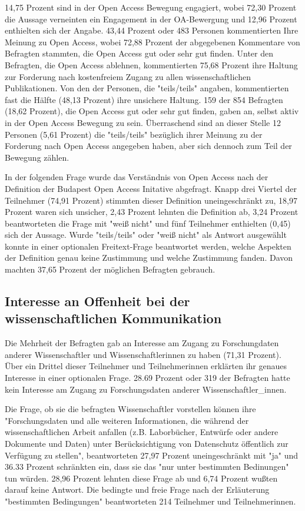 14,75 Prozent sind in der Open Access Bewegung engagiert, wobei 72,30 Prozent die Aussage verneinten ein Engagement in der OA-Bewergung und 12,96 Prozent enthielten sich der Angabe. 43,44 Prozent oder 483 Personen kommentierten Ihre Meinung zu Open Access, wobei 72,88 Prozent der abgegebenen Kommentare von Befragten stammten, die Open Access gut oder sehr gut finden. Unter den Befragten, die Open Access ablehnen, kommentierten 75,68 Prozent ihre Haltung zur Forderung nach kostenfreiem Zugang zu allen wissenschaftlichen Publikationen. Von den der Personen, die "teils/teils" angaben, kommentierten fast die Hälfte (48,13 Prozent) ihre unsichere Haltung. 159 der 854 Befragten (18,62 Prozent), die Open Access gut oder sehr gut finden, gaben an, selbst aktiv in der Open Access Bewegung zu sein. Überraschend sind an dieser Stelle 12 Personen (5,61 Prozent) die "teils/teils" bezüglich ihrer Meinung zu der Forderung nach Open Access angegeben haben, aber sich dennoch zum Teil der Bewegung zählen.

In der folgenden Frage wurde das Verständnis von Open Access nach der Definition der Budapest Open Access Initative \cite{boai_2012} abgefragt. Knapp drei Viertel der Teilnehmer (74,91 Prozent) stimmten dieser Definition uneingeschränkt zu, 18,97 Prozent waren sich unsicher, 2,43 Prozent lehnten die Definition ab, 3,24 Prozent beantworteten die Frage mit "weiß nicht" und fünf Teilnehmer enthielten (0,45) sich der Aussage. Wurde "teils/teils" oder "weiß nicht" als Antwort ausgewählt konnte in einer optionalen Freitext-Frage beantwortet werden, welche Aspekten der Definition genau keine Zustimmung und welche Zustimmung fanden. Davon machten 37,65 Prozent der möglichen Befragten gebrauch.

\subsection{Interesse an Offenheit bei der wissenschaftlichen Kommunikation}

Die Mehrheit der Befragten gab an Interesse am Zugang zu Forschungdaten anderer Wissenschaftler und Wissenschaftlerinnen zu haben (71,31 Prozent). Über ein Drittel dieser Teilnehmer und Teilnehmerinnen erklärten ihr genaues Interesse in einer optionalen Frage. 28.69 Prozent oder 319 der Befragten hatte kein Interesse am Zugang zu Forschungsdaten anderer Wissenschaftler_innen.

Die Frage, ob sie die befragten Wissenschaftler vorstellen können ihre "Forschungsdaten und alle weiteren Informationen, die während der wissenschaftlichen Arbeit anfallen (z.B. Laborbücher, Entwürfe oder andere Dokumente und Daten) unter Berücksichtigung von Datenschutz öffentlich zur Verfügung zu stellen", beantworteten 27,97 Prozent uneingeschränkt mit "ja" und 36.33 Prozent schränkten ein, dass sie das "nur unter bestimmten Bedinungen" tun würden.  28,96 Prozent lehnten diese Frage ab und 6,74 Prozent wußten darauf keine Antwort. Die bedingte und freie Frage nach der Erläuterung "bestimmten Bedingungen" beantworteten 214 Teilnehmer und Teilnehmerinnen.


